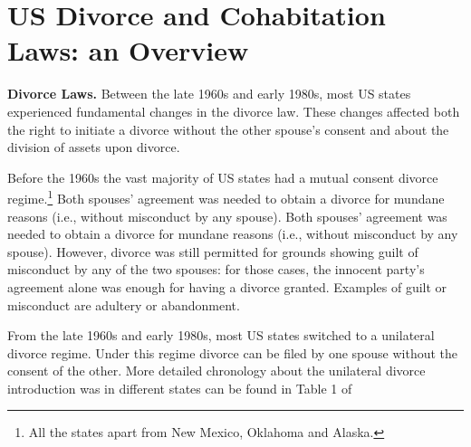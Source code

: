 \documentclass[12pt]{article}
\numberwithin{table}{section}
\begin{document}
\section{US Divorce and Cohabitation Laws: an Overview} %
\textbf{Divorce Laws.} Between the late 1960s and early 1980s, most US states experienced fundamental changes in the divorce law. These changes affected both the right to initiate a divorce without the other spouse's consent and about the division of assets upon divorce.

Before the 1960s the vast majority of US states had a mutual consent divorce regime.\footnote{All the states apart from New Mexico, Oklahoma and Alaska.} Both spouses' agreement was needed to obtain a divorce for mundane reasons (i.e., without misconduct by any spouse). Both spouses' agreement was needed to obtain a divorce for mundane reasons (i.e., without misconduct by any spouse). However, divorce was still permitted for grounds showing guilt of misconduct by any of the two spouses: for those cases, the innocent party's agreement alone was enough for having a divorce granted. Examples of guilt or misconduct are adultery or abandonment.

From the late 1960s and early 1980s, most US states switched to a unilateral divorce regime. Under this regime divorce can be filed by one spouse without the consent of the other. More detailed chronology about the unilateral divorce introduction was in different states can be found in Table 1 of \cite{ciacci2017}%
\end{document}
